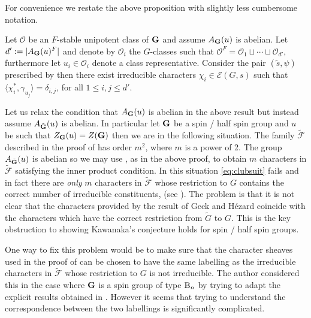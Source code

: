 \documentclass{jt-calcs}
\renewcommand{\cref}{\Cref}
\begin{document}
For convenience we restate the above proposition with slightly less cumbersome notation.

\begin{cor}\label{cor:conj-abelian-comp}
Let $\mathcal{O}$ be an $F$-stable unipotent class of $\mathbf{G}$ and assume $A_{\mathbf{G}}(u)$ is abelian. Let $d' := |A_{\mathbf{G}}(u)^F|$ and denote by $\mathcal{O}_i$ the $G$-classes such that $\mathcal{O}^F = \mathcal{O}_1\sqcup \cdots \sqcup \mathcal{O}_{d'}$, furthermore let $u_i \in \mathcal{O}_i$ denote a class representative. Consider the pair $(\tilde{s},\psi)$ prescribed by \cref{prop:A} then there exist irreducible characters $\chi_i \in \mathcal{E}(G,s)$ such that $\langle \chi_i^*, \gamma_{u_j} \rangle = \delta_{i,j}$, for all $1 \leqslant i,j \leqslant d'$.
\end{cor}

\begin{rem}
Let us relax the condition that $A_{\mathbf{G}}(u)$ is abelian in the above result but instead assume $A_{\tilde{\mathbf{G}}}(u)$ is abelian. In particular let $\mathbf{G}$ be a spin / half spin group and $u$ be such that $Z_{\mathbf{G}}(u) = Z(\mathbf{G})$ then we are in the following situation. The family $\tilde{\mathcal{F}}$ described in the proof of \cref{prop:inner-prod} has order $m^2$, where $m$ is a power of 2. The group $A_{\tilde{\mathbf{G}}}(u)$ is abelian so we may use \cite[Proposition 4.3]{geck-hezard:2008:unipotent-support}, as in the above proof, to obtain $m$ characters in $\tilde{\mathcal{F}}$ satisfying the inner product condition. In this situation \eqref{eq:clubsuit} fails and in fact there are \emph{only} $m$ characters in $\mathcal{\tilde{F}}$ whose restriction to $G$ contains the correct number of irreducible constituents, (see \cite[Propositions 9.3 and 11.10]{taylor:2012:finding-characters-satisfying}). The problem is that it is not clear that the characters provided by the result of Geck and H\'{e}zard coincide with the characters which have the correct restriction from $\tilde{G}$ to $G$. This is the key obstruction to showing Kawanaka's conjecture holds for spin / half spin groups.
\end{rem}

One way to fix this problem would be to make sure that the character sheaves used in the proof of \cite[Corollary 3.5]{geck-hezard:2008:unipotent-support} can be chosen to have the same labelling as the irreducible characters in $\mathcal{\tilde{F}}$ whose restriction to $G$ is not irreducible. The author considered this in the case where $\mathbf{G}$ is a spin group of type $\operatorname{B}_n$ by trying to adapt the explicit results obtained in \cite{lusztig:1986:on-the-character-values}. However it seems that trying to understand the correspondence between the two labellings is significantly complicated.
\end{document}
